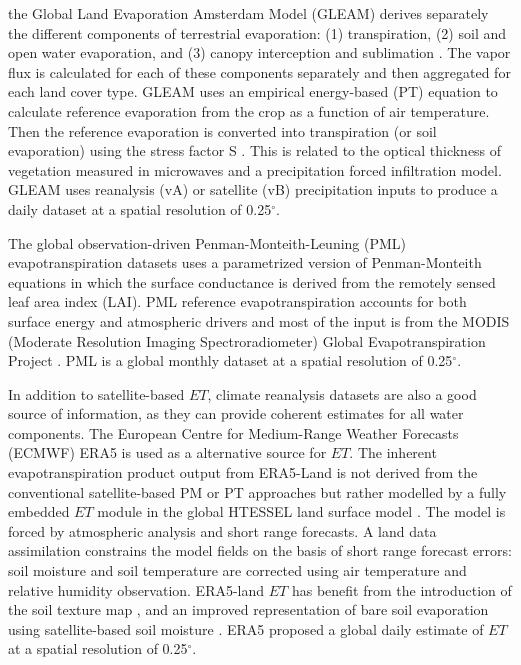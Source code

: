 \documentclass[draft]{agujournal2019}
\begin{document}
the Global Land Evaporation Amsterdam Model (GLEAM) derives separately the different components of terrestrial evaporation: (1) transpiration, (2) soil and open water evaporation, and (3) canopy interception and sublimation \cite{Martens2016,Miralles2011}. The vapor flux is calculated for each of these components separately and then aggregated for each land cover type. GLEAM uses an empirical energy-based  \cite{PRIESTLEY1972} (PT) equation to calculate reference evaporation from the crop as a function of air temperature. Then the reference evaporation is converted into transpiration (or soil evaporation) using the stress factor S . This is related to the optical thickness of vegetation measured in microwaves and a precipitation forced infiltration model. GLEAM uses reanalysis (vA) or satellite (vB) precipitation inputs to produce a daily dataset at a spatial resolution of 0.25$^\circ$.

The global observation-driven Penman-Monteith-Leuning (PML) \cite{CSIRO2016} evapotranspiration datasets uses a parametrized version of Penman-Monteith equations \cite{PENMAN1948,Monteith1965} in which the surface conductance is derived from the remotely sensed leaf area index (LAI). PML reference evapotranspiration accounts for both surface energy and atmospheric drivers and most of the input is from the MODIS (Moderate Resolution Imaging Spectroradiometer) Global Evapotranspiration Project \cite{Mu2011}. PML is a global monthly dataset at a spatial resolution of 0.25$^\circ$.

In addition to satellite-based $ET$, climate reanalysis datasets are also a good source of information, as they can provide coherent estimates for all water components. The European Centre for Medium-Range Weather Forecasts (ECMWF) ERA5 \cite{Hersbach2016} is used as a alternative source for $ET$. The inherent evapotranspiration product output from ERA5-Land is not derived from the conventional satellite-based PM or PT approaches but rather modelled by a fully embedded $ET$ module in the global HTESSEL land surface model \cite{Balsamo2015}. The model is forced by atmospheric analysis and short range forecasts. A land data assimilation constrains the model fields on the basis of short range forecast errors: soil moisture and soil temperature are corrected using air temperature and relative humidity observation. ERA5-land $ET$ has benefit from the introduction of the soil texture map \cite{Balsamo2009}, and an improved representation of bare soil evaporation using satellite-based soil moisture \cite{Albergel2012}. ERA5 proposed a global daily estimate of $ET$ at a spatial resolution of 0.25$^\circ$.
\end{document}
